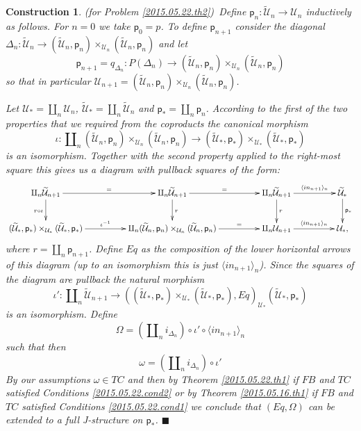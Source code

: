 \documentclass[12pt]{article}
\numberwithin{equation}{section}
\newtheorem{construction0}[proposition]{Construction}
\newenvironment{construction}[1]{\begin{construction0}(for Problem \ref{#1})\ }{$\blacksquare$ \end{construction0}}
\newcommand{\llabel}[1]{\label{#1}}
\newcommand{\sr}{\rightarrow}
\newcommand{\wt}{\widetilde}
\newcommand{\p}{\mathsf{p}}
\newcommand{\U}{\mathcal{U}}
\begin{document}
\begin{construction}{2015.05.22.th2}\rm\llabel{2015.05.23.constr1}
Define $\p_n:\wt{\U}_n\sr \U_n$ inductively as follows. For $n=0$ we take
$\p_0=p$. To define $\p_{n+1}$ consider the diagonal $\Delta_n:\wt{\U}_n\sr
(\wt{\U}_n,\p_n)\times_{\U_n}(\wt{\U}_n,\p_n)$ and let
%
$$\p_{n+1}=q_{\Delta_n}:P(\Delta_n)\sr
(\wt{\U}_n,\p_n)\times_{\U_n}(\wt{\U}_n,\p_n)$$
%
so that in particular $\U_{n+1}=(\wt{\U}_n,\p_n)\times_{\U_n}(\wt{\U}_n,\p_n)$.

Let $\U_*=\amalg_n \U_n$, $\wt{\U}_*=\amalg_n\wt{\U}_n$ and $\p_*=\amalg_n
\p_n$. According to the first of the two properties that we required from the
coproducts the canonical morphism
%
$$\iota:\amalg_n (\wt{\U}_n,\p_n)\times_{\U_n}(\wt{\U}_n,\p_n)\sr
(\wt{\U}_*,\p_*)\times_{\U_*}(\wt{\U}_*,\p_*)$$
%
is an isomorphism. Together with the second property applied to the right-most
square this gives us a diagram with pullback squares of the form:
%
$$
\begin{xy}
          \xymatrix@C=4pc{
                 \amalg_n\wt{\U}_{n+1}  \ar[r]^-{=} \ar[d]_{r\circ \iota} & 
                 \amalg_n\wt{\U}_{n+1} \ar[r]^-{=} \ar[d]^{r} &
		 \amalg_n\wt{\U}_{n+1} \ar[r]^-{\langle in_{n+1} \rangle_{n}} \ar[d]^{r} &
		\wt{\U}_* \ar[d]^{\p_*} \\
		(\wt{\U}_*,\p_*)\times_{\U_*}(\wt{\U}_*,\p_*) \ar[r]^-{\iota^{-1}} &
		\amalg_n (\wt{\U}_n,\p_n)\times_{\U_n}(\wt{\U}_n,\p_n) \ar[r]^-{=} &
		\amalg_n \U_{n+1} \ar[r]^-{\langle in_{n+1} \rangle_{n}} &
		\U_*,
                }
\end{xy}
$$
%
where  $r=\amalg_n  \p_{n+1}$. Define  $Eq$  as  the  composition of  the  lower
horizontal arrows of  this diagram (up to an isomorphism  this is just $\langle
in_{n+1}\rangle_{n}$).  Since  the squares  of  the  diagram are  pullback  the
natural morphism
%
$$\iota':\amalg_n\wt{\U}_{n+1}\sr
((\wt{\U}_*,\p_*)\times_{\U_*}(\wt{\U}_*,\p_*),Eq)_{\U_*} (\wt{\U}_*,\p_*)$$
%
is an isomorphism. Define
%
$$\Omega=(\amalg_n    i_{\Delta_n})\circ     \iota'\circ    \langle    in_{n+1}
\rangle_{n}$$
%
such that then
%
$$\omega=(\amalg_n i_{\Delta_n})\circ \iota'$$
%
By our assumptions  $\omega\in TC$ and then by  Theorem \ref{2015.05.22.th1} if
$FB$  and  $TC$  satisfied  Conditions  \ref{2015.05.22.cond2}  or  by  Theorem
\ref{2015.05.16.th1}     if    $FB$     and    $TC$     satisfied    Conditions
\ref{2015.05.22.cond1} we conclude that $(Eq,\Omega)$ can be extended to a full
J-structure on $\p_*$.
\end{construction}
%
\end{document}

